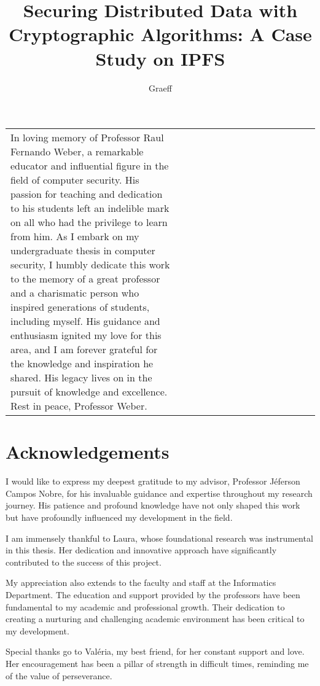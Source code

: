 \documentclass[cic,tc,english]{iiufrgs}
\title{
    Securing Distributed Data with Cryptographic Algorithms: A Case Study on 
    IPFS
}
\author{Graeff}{Felipe de Almeida}
\begin{document}
\maketitle

\clearpage
\begin{flushright}
    \mbox{}\vfill
    \begin{tabular}{p{0.55\linewidth} p{0.45\linewidth}}
        In loving memory of Professor Raul Fernando Weber, a remarkable educator and influential figure in the field of computer security. His passion for teaching and dedication to his students left an indelible mark on all who had the privilege to learn from him. As I embark on my undergraduate thesis in computer security, I humbly dedicate this work to the memory of a great professor and a charismatic person who inspired generations of students, including myself. His guidance and enthusiasm ignited my love for this area, and I am forever grateful for the knowledge and inspiration he shared. His legacy lives on in the pursuit of knowledge and excellence. Rest in peace, Professor Weber.\\
    \end{tabular}
\end{flushright}

\chapter*{Acknowledgements}
    I would like to express my deepest gratitude to my advisor, Professor 
    Jéferson Campos Nobre, for his invaluable guidance and expertise throughout 
    my research journey. His patience and profound knowledge have not only 
    shaped this work but have profoundly influenced my development in the field.

    I am immensely thankful to Laura, whose foundational research was 
    instrumental in this thesis. Her dedication and innovative approach have 
    significantly contributed to the success of this project.

    My appreciation also extends to the faculty and staff at the Informatics 
    Department. The education and support provided by the professors have
    been fundamental to my academic and professional growth. Their dedication to
    creating a nurturing and challenging academic environment has been critical 
    to my development.

    Special thanks go to Valéria, my best friend, for her constant support and 
    love. Her encouragement has been a pillar of strength in difficult times, 
    reminding me of the value of perseverance.
\end{document}
